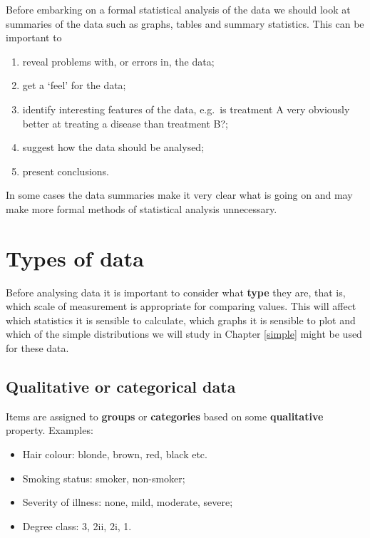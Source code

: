 \documentclass[
  british,
  11pt,
  openany, a4paper]{book}
\providecommand{\tightlist}{%
  \setlength{\itemsep}{0pt}\setlength{\parskip}{0pt}}
\begin{document}
Before embarking on a formal statistical analysis of the data we should look at summaries of the data such as graphs, tables and summary statistics. This can be important to

\begin{enumerate}
\def\labelenumi{\arabic{enumi}.}
\tightlist
\item
  reveal problems with, or errors in, the data;
\item
  get a `feel' for the data;
\item
  identify interesting features of the data, e.g.~is treatment A very
  obviously better at treating a disease than treatment B?;
\item
  suggest how the data should be analysed;
\item
  present conclusions.
\end{enumerate}

In some cases the data summaries make it very clear what is going on and may
make more formal methods of statistical analysis unnecessary.

\section{Types of data}\label{types-of-data}

Before analysing data it is important to consider what \textbf{type} they are, that is, which scale of measurement is appropriate for comparing values. This will affect which statistics it is sensible to calculate, which graphs it is sensible to plot and which of the simple distributions we will study in Chapter \ref{simple} might be used for these data.

\subsection{Qualitative or categorical data}\label{qualitative-or-categorical-data}

Items are assigned to \textbf{groups} or \textbf{categories} based on some \textbf{qualitative} property. Examples:

\begin{itemize}
\tightlist
\item
  Hair colour: blonde, brown, red, black etc.
\item
  Smoking status: smoker, non-smoker;
\item
  Severity of illness: none, mild, moderate, severe;
\item
  Degree class: 3, 2ii, 2i, 1.
\end{itemize}
\end{document}
